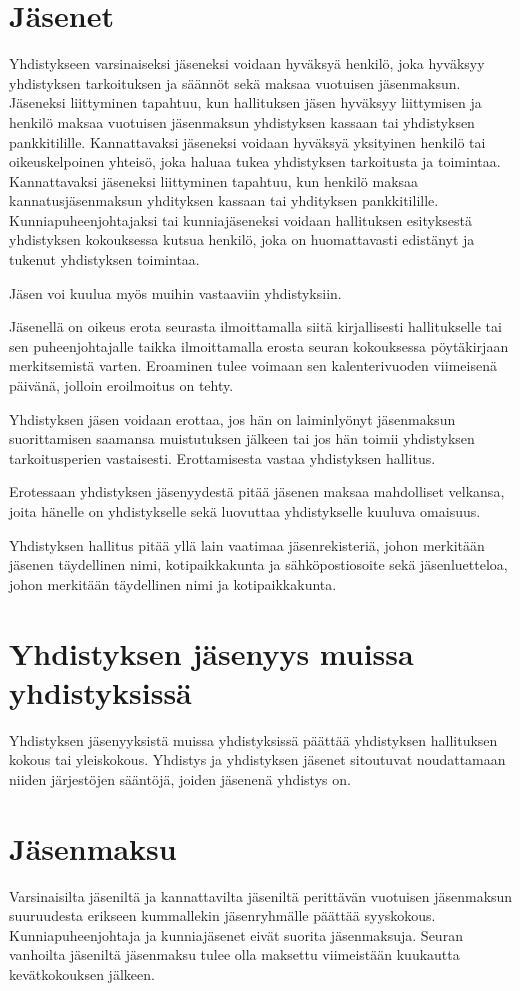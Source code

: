 \documentclass[a4paper, 12pt, finnish]{scrartcl}
\begin{document}
\section{Jäsenet}
Yhdistykseen varsinaiseksi jäseneksi voidaan hyväksyä henkilö, joka hyväksyy yhdistyksen tarkoituksen ja säännöt sekä maksaa vuotuisen jäsenmaksun.
Jäseneksi liittyminen tapahtuu, kun hallituksen jäsen hyväksyy liittymisen ja henkilö maksaa vuotuisen jäsenmaksun yhdistyksen kassaan tai yhdistyksen pankkitilille.
Kannattavaksi jäseneksi voidaan hyväksyä yksityinen henkilö tai oikeuskelpoinen yhteisö, joka haluaa tukea yhdistyksen tarkoitusta ja toimintaa.
Kannattavaksi jäseneksi liittyminen tapahtuu, kun henkilö maksaa kannatusjäsenmaksun yhdityksen kassaan tai yhdityksen pankkitilille.
Kunniapuheenjohtajaksi tai kunniajäseneksi voidaan hallituksen esityksestä yhdistyksen kokouksessa kutsua henkilö, joka on huomattavasti edistänyt ja tukenut yhdistyksen toimintaa.

Jäsen voi kuulua myös muihin vastaaviin yhdistyksiin.

Jäsenellä on oikeus erota seurasta ilmoittamalla siitä kirjallisesti hallitukselle tai sen puheenjohtajalle taikka ilmoittamalla erosta seuran kokouksessa pöytäkirjaan merkitsemistä varten. Eroaminen tulee voimaan sen kalenterivuoden viimeisenä päivänä, jolloin eroilmoitus on tehty.

Yhdistyksen jäsen voidaan erottaa, jos hän on laiminlyönyt jäsenmaksun suorittamisen saamansa muistutuksen jälkeen tai jos hän toimii yhdistyksen tarkoitusperien vastaisesti.
Erottamisesta vastaa yhdistyksen hallitus.

Erotessaan yhdistyksen jäsenyydestä pitää jäsenen maksaa mahdolliset velkansa, joita hänelle on yhdistykselle sekä luovuttaa yhdistykselle kuuluva omaisuus.

Yhdistyksen hallitus pitää yllä lain vaatimaa jäsenrekisteriä, johon merkitään jäsenen täydellinen nimi, kotipaikkakunta ja sähköpostiosoite sekä jäsenluetteloa, johon merkitään täydellinen nimi ja kotipaikkakunta.


\section{Yhdistyksen jäsenyys muissa yhdistyksissä}
Yhdistyksen jäsenyyksistä muissa yhdistyksissä päättää yhdistyksen hallituksen kokous tai yleiskokous.
Yhdistys ja yhdistyksen jäsenet sitoutuvat noudattamaan niiden järjestöjen sääntöjä, joiden jäsenenä yhdistys on.

\section{Jäsenmaksu}
Varsinaisilta jäseniltä ja kannattavilta jäseniltä perittävän vuotuisen jäsenmaksun suuruudesta erikseen kummallekin jäsenryhmälle päättää syyskokous.
Kunniapuheenjohtaja ja kunniajäsenet eivät suorita jäsenmaksuja.
Seuran vanhoilta jäseniltä jäsenmaksu tulee olla maksettu viimeistään kuukautta kevätkokouksen jälkeen.
\end{document}
